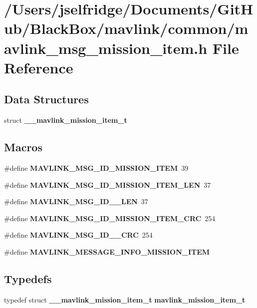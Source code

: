 \section{/\+Users/jselfridge/\+Documents/\+Git\+Hub/\+Black\+Box/mavlink/common/mavlink\+\_\+msg\+\_\+mission\+\_\+item.h File Reference}
\label{mavlink__msg__mission__item_8h}
\subsection*{Data Structures}
\begin{DoxyCompactItemize}
\item 
struct \textbf{ \+\_\+\+\_\+mavlink\+\_\+mission\+\_\+item\+\_\+t}
\end{DoxyCompactItemize}
\subsection*{Macros}
\begin{DoxyCompactItemize}
\item 
\#define \textbf{ M\+A\+V\+L\+I\+N\+K\+\_\+\+M\+S\+G\+\_\+\+I\+D\+\_\+\+M\+I\+S\+S\+I\+O\+N\+\_\+\+I\+T\+EM}~39
\item 
\#define \textbf{ M\+A\+V\+L\+I\+N\+K\+\_\+\+M\+S\+G\+\_\+\+I\+D\+\_\+\+M\+I\+S\+S\+I\+O\+N\+\_\+\+I\+T\+E\+M\+\_\+\+L\+EN}~37
\item 
\#define \textbf{ M\+A\+V\+L\+I\+N\+K\+\_\+\+M\+S\+G\+\_\+\+I\+D\+\_\+\_\+\+L\+EN}~37
\item 
\#define \textbf{ M\+A\+V\+L\+I\+N\+K\+\_\+\+M\+S\+G\+\_\+\+I\+D\+\_\+\+M\+I\+S\+S\+I\+O\+N\+\_\+\+I\+T\+E\+M\+\_\+\+C\+RC}~254
\item 
\#define \textbf{ M\+A\+V\+L\+I\+N\+K\+\_\+\+M\+S\+G\+\_\+\+I\+D\+\_\+\_\+\+C\+RC}~254
\item 
\#define \textbf{ M\+A\+V\+L\+I\+N\+K\+\_\+\+M\+E\+S\+S\+A\+G\+E\+\_\+\+I\+N\+F\+O\+\_\+\+M\+I\+S\+S\+I\+O\+N\+\_\+\+I\+T\+EM}
\end{DoxyCompactItemize}
\subsection*{Typedefs}
\begin{DoxyCompactItemize}
\item 
typedef struct \textbf{ \+\_\+\+\_\+mavlink\+\_\+mission\+\_\+item\+\_\+t} \textbf{ mavlink\+\_\+mission\+\_\+item\+\_\+t}
\end{DoxyCompactItemize}


